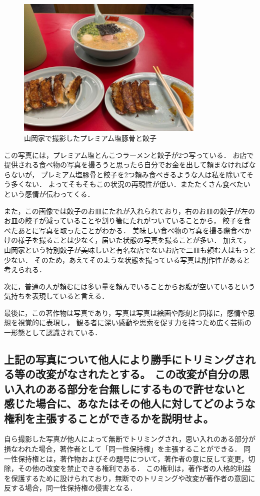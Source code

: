 \documentclass[titlepage,a4paper]{jsarticle}
\begin{document}
\begin{figure}[H]
  \centering
  \includegraphics[width=0.8\textwidth]{img/img_task3_2.png}
  \caption{山岡家で撮影したプレミアム塩豚骨と餃子}
  \label{food}
\end{figure}

この写真には，プレミアム塩とんこつラーメンと餃子が2つ写っている．
お店で提供される食べ物の写真を撮ろうと思ったら自分でお金を出して頼まなければならないが，
プレミアム塩豚骨と餃子を2つ頼み食べきるような人は私を除いてそう多くない．
よってそもそもこの状況の再現性が低い．またたくさん食べたいという感情が伝わってくる．

また，この画像では餃子のお皿にたれが入れられており，右のお皿の餃子が左のお皿の餃子が減っていることや割り箸にたれがついていることから，
餃子を食べたあとに写真を取ったことがわかる．
美味しい食べ物の写真を撮る際食べかけの様子を撮ることは少なく，届いた状態の写真を撮ることが多い．
加えて，山岡家という特別餃子が美味しいと有名な店でないお店で二皿も頼む人はもっと少ない．
そのため，あえてそのような状態を撮っている写真は創作性があると考えられる．

次に，普通の人が頼むには多い量を頼んでいることからお腹が空いているという気持ちを表現していると言える．

最後に，この著作物は写真であり，写真は写真は絵画や彫刻と同様に，感情や思想を視覚的に表現し，
観る者に深い感動や思索を促す力を持つため広く芸術の一形態として認識されている．

\subsection{上記の写真について他人により勝手にトリミングされる等の改変がなされたとする。
  この改変が自分の思い入れのある部分を台無しにするもので許せないと感じた場合に、あなたはその他人に対してどのような権利を主張することができるかを説明せよ。}
自ら撮影した写真が他人によって無断でトリミングされ，思い入れのある部分が損なわれた場合，著作者として「同一性保持権」を主張することができる．
同一性保持権とは，著作物およびその題号について，著作者の意に反して変更，切除，その他の改変を禁止できる権利である．
この権利は，著作者の人格的利益を保護するために設けられており，無断でのトリミングや改変が著作者の意図に反する場合，同一性保持権の侵害となる．\cite{task3_2}
\end{document}
